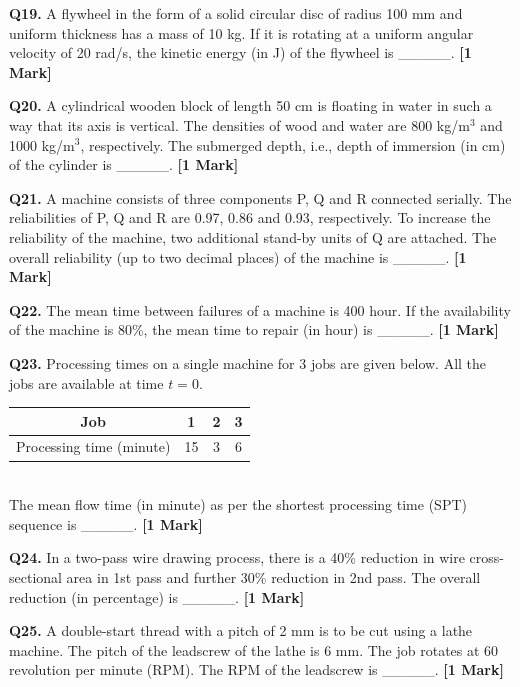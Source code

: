 \documentclass[11pt]{article}
\newcommand{\questiona}[2]{
    \noindent\textbf{Q#2.} #1 \hfill \textbf{[1 Mark]}
}
\begin{document}
\questiona{A flywheel in the form of a solid circular disc of radius 100 mm and uniform thickness has a mass of 10 kg. If it is rotating at a uniform angular velocity of 20 rad/s, the kinetic energy (in J) of the flywheel is \_\_\_\_\_.}{19}
\vspace{0.5cm}

\questiona{A cylindrical wooden block of length 50 cm is floating in water in such a way that its axis is vertical. The densities of wood and water are 800 kg/m\(^3\) and 1000 kg/m\(^3\), respectively. The submerged depth, i.e., depth of immersion (in cm) of the cylinder is \_\_\_\_\_.}{20}
\vspace{0.5cm}

\questiona{A machine consists of three components P, Q and R connected serially. The reliabilities of P, Q and R are 0.97, 0.86 and 0.93, respectively. To increase the reliability of the machine, two additional stand-by units of Q are attached. The overall reliability (up to two decimal places) of the machine is \_\_\_\_\_.}{21}
\vspace{0.5cm}

\questiona{The mean time between failures of a machine is 400 hour. If the availability of the machine is 80\%, the mean time to repair (in hour) is \_\_\_\_\_.}{22}
\vspace{0.5cm}

\questiona{Processing times on a single machine for 3 jobs are given below. All the jobs are available at time \( t = 0 \).\\

\begin{tabular}{|c|c|c|c|}
\hline
Job & 1 & 2 & 3 \\
\hline
Processing time (minute) & 15 & 3 & 6 \\
\hline
\end{tabular}\\

The mean flow time (in minute) as per the shortest processing time (SPT) sequence is \_\_\_\_\_.}{23}
\vspace{0.5cm}

\questiona{In a two-pass wire drawing process, there is a 40\% reduction in wire cross-sectional area in 1st pass and further 30\% reduction in 2nd pass. The overall reduction (in percentage) is \_\_\_\_\_.}{24}
\vspace{0.5cm}

\questiona{A double-start thread with a pitch of 2 mm is to be cut using a lathe machine. The pitch of the leadscrew of the lathe is 6 mm. The job rotates at 60 revolution per minute (RPM). The RPM of the leadscrew is \_\_\_\_\_.}{25}
\vspace{0.5cm}
\end{document}
